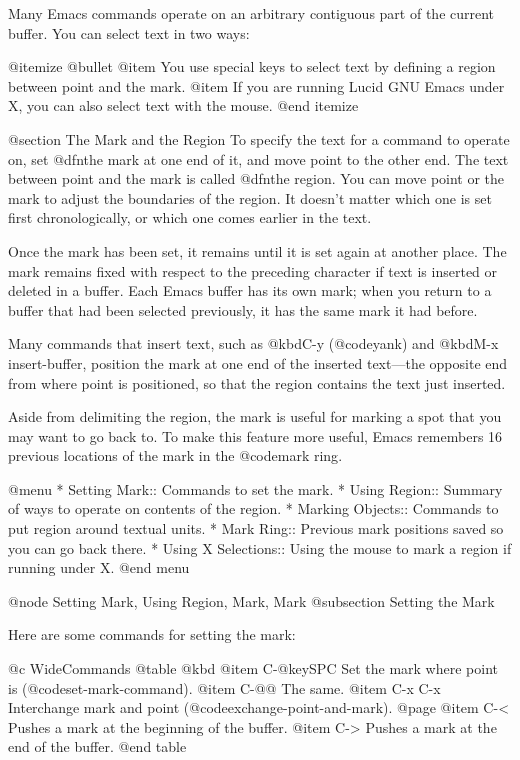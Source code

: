 {{  Many Emacs commands operate on an arbitrary contiguous
part of the current buffer. You can select text in two ways:

@itemize @bullet
@item
You use special keys to select text by defining a region between point
and the mark. 
@item
If you are running Lucid GNU Emacs under X, you can also select text
with the mouse. 
@end itemize

@section The Mark and the Region
 To specify the text for a command to operate on, set @dfn{the
mark} at one end of it, and move point to the other end.  The text
between point and the mark is called @dfn{the region}.  You can move
point or the mark to adjust the boundaries of the region.  It doesn't
matter which one is set first chronologically, or which one comes
earlier in the text.
  
  Once the mark has been set, it remains until it is set again at
another place.  The mark remains fixed with respect to the preceding
character if text is inserted or deleted in a buffer.  Each Emacs
buffer has its own mark; when you return to a buffer that had been
selected previously, it has the same mark it had before.

  Many commands that insert text, such as @kbd{C-y} (@code{yank}) and
@kbd{M-x insert-buffer}, position the mark at one end of the inserted
text---the opposite end from where point is positioned, so that the region
contains the text just inserted.

  Aside from delimiting the region, the mark is useful for marking
a spot that you may want to go back to.  To make this feature more useful,
Emacs remembers 16 previous locations of the mark in the @code{mark ring}.

@menu
* Setting Mark::	Commands to set the mark.
* Using Region::	Summary of ways to operate on contents of the region.
* Marking Objects::	Commands to put region around textual units.
* Mark Ring::   	Previous mark positions saved so you can go back there.
* Using X Selections::  Using the mouse to mark a region if running under X.
@end menu

@node Setting Mark, Using Region, Mark, Mark
@subsection Setting the Mark

  Here are some commands for setting the mark:

@c WideCommands
@table @kbd
@item C-@key{SPC}
Set the mark where point is (@code{set-mark-command}).
@item C-@@
The same.
@item C-x C-x
Interchange mark and point (@code{exchange-point-and-mark}).
@page
@item C-<
Pushes a mark at the beginning of the buffer.
@item C->
Pushes a mark at the end of the buffer.
@end table

}}
